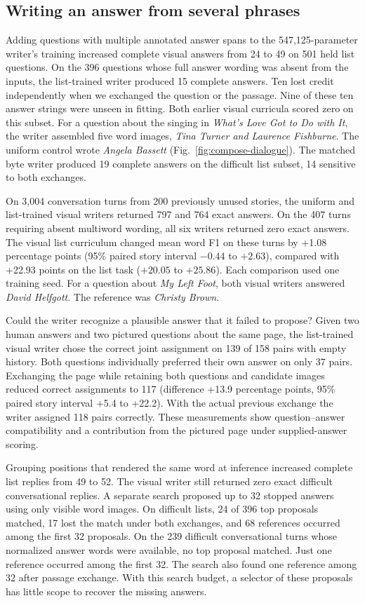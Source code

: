 \subsection*{Writing an answer from several phrases}
Adding questions with multiple annotated answer spans to the 547,125-parameter writer's training increased complete visual answers from 24 to 49 on 501 held list questions. On the 396 questions whose full answer wording was absent from the inputs, the list-trained writer produced 15 complete answers. Ten lost credit independently when we exchanged the question or the passage. Nine of these ten answer strings were unseen in fitting. Both earlier visual curricula scored zero on this subset. For a question about the singing in \emph{What's Love Got to Do with It}, the writer assembled five word images, \emph{Tina Turner and Laurence Fishburne}. The uniform control wrote \emph{Angela Bassett} (Fig.~\ref{fig:compose-dialogue}). The matched byte writer produced 19 complete answers on the difficult list subset, 14 sensitive to both exchanges.

On 3,004 conversation turns from 200 previously unused stories, the uniform and list-trained visual writers returned 797 and 764 exact answers. On the 407 turns requiring absent multiword wording, all six writers returned zero exact answers. The visual list curriculum changed mean word F1 on these turns by +1.08 percentage points (95\% paired story interval $-0.44$ to $+2.63$), compared with +22.93 points on the list task ($+20.05$ to $+25.86$). Each comparison used one training seed. For a question about \emph{My Left Foot}, both visual writers answered \emph{David Helfgott}. The reference was \emph{Christy Brown}.

Could the writer recognize a plausible answer that it failed to propose? Given two human answers and two pictured questions about the same page, the list-trained visual writer chose the correct joint assignment on 139 of 158 pairs with empty history. Both questions individually preferred their own answer on only 37 pairs. Exchanging the page while retaining both questions and candidate images reduced correct assignments to 117 (difference +13.9 percentage points, 95\% paired story interval +5.4 to +22.2). With the actual previous exchange the writer assigned 118 pairs correctly. These measurements show question--answer compatibility and a contribution from the pictured page under supplied-answer scoring.

Grouping positions that rendered the same word at inference increased complete list replies from 49 to 52. The visual writer still returned zero exact difficult conversational replies. A separate search proposed up to 32 stopped answers using only visible word images. On difficult lists, 24 of 396 top proposals matched, 17 lost the match under both exchanges, and 68 references occurred among the first 32 proposals. On the 239 difficult conversational turns whose normalized answer words were available, no top proposal matched. Just one reference occurred among the first 32. The search also found one reference among 32 after passage exchange. With this search budget, a selector of these proposals has little scope to recover the missing answers.
